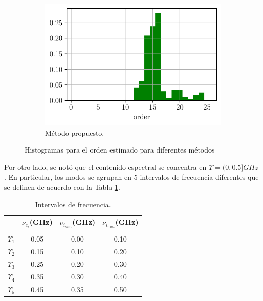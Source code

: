 \begin{figure}
\begin{subfigure}{0.3\linewidth}
                \includegraphics[width = \linewidth]{Figuras/orden_mio_UWB.pdf}
                \caption{Método propuesto.}
            \end{subfigure}
            \caption{Histogramas para el orden estimado para diferentes métodos}
            \label{fig:enter-label}
        \end{figure}

        
    Por otro lado, se notó que el contenido espectral se concentra en $\Upsilon = (0,0.5] GHz$ . En particular, los modos se agrupan en  $5$ intervalos de frecuencia diferentes que se definen de acuerdo con la Tabla \ref{Table:segments}.

	\begin{table}[ht]
		\centering
		\caption{Intervalos de frecuencia.\label{Table:segments}}
		{\begin{tabular*}{20pc}{@{\extracolsep{\fill}}cccc@{}}
				& $\nu_{c_i}$(GHz)       & $\nu_{i_{min}}$(GHz)      & $\nu_{i_{max}}$(GHz) \\ \hline \\[-0.9em] 
				
				$\Upsilon_1$   & 0.05 & 0.00 & 0.10  \\ 
				$\Upsilon_2$   & 0.15 & 0.10 & 0.20  \\ 
				$\Upsilon_3$   & 0.25 & 0.20 & 0.30 \\ 
				$\Upsilon_4$   & 0.35 & 0.30 & 0.40   \\ 
				$\Upsilon_5$   & 0.45 & 0.35 & 0.50   \\ \hline	
		\end{tabular*}}{}
	\end{table}

